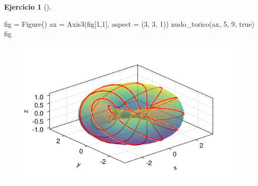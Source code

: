 \documentclass[
  a4paper,
]{scrreport}
\newenvironment{Shaded}{\begin{snugshade}}{\end{snugshade}}
\newcommand{\ConstantTok}[1]{\textcolor[rgb]{0.56,0.35,0.01}{#1}}
\newcommand{\FloatTok}[1]{\textcolor[rgb]{0.68,0.00,0.00}{#1}}
\newcommand{\FunctionTok}[1]{\textcolor[rgb]{0.28,0.35,0.67}{#1}}
\newcommand{\NormalTok}[1]{\textcolor[rgb]{0.00,0.23,0.31}{#1}}
\newcommand{\OperatorTok}[1]{\textcolor[rgb]{0.37,0.37,0.37}{#1}}
\theoremstyle{definition}
\newtheorem{exercise}{Ejercicio}[chapter]
\theoremstyle{remark}
\begin{document}
\begin{exercise}[]
\begin{enumerate}
\begin{tcolorbox}
\begin{Shaded}
\begin{Highlighting}[]
\NormalTok{fig }\OperatorTok{=} \FunctionTok{Figure}\NormalTok{()}
\NormalTok{ax }\OperatorTok{=} \FunctionTok{Axis3}\NormalTok{(fig[}\FloatTok{1}\NormalTok{,}\FloatTok{1}\NormalTok{], aspect }\OperatorTok{=}\NormalTok{ (}\FloatTok{3}\NormalTok{, }\FloatTok{3}\NormalTok{, }\FloatTok{1}\NormalTok{))}
\FunctionTok{nudo\_torico}\NormalTok{(ax, }\FloatTok{5}\NormalTok{, }\FloatTok{9}\NormalTok{, }\ConstantTok{true}\NormalTok{)}
\NormalTok{fig}
\end{Highlighting}
\end{Shaded}

  \begin{figure}[H]

  {\centering \includegraphics{08-funciones-vectoriales_files/figure-pdf/cell-14-output-1.png}

  }

  \end{figure}

  \end{tcolorbox}
\end{enumerate}

\end{exercise}
\end{document}
